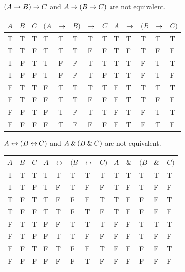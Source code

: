 \begin{earg}
\item $(A \rightarrow B) \rightarrow C$ and $A \rightarrow (B \rightarrow C)$ are not equivalent.
\begin{flushleft}
\begin{tabular}{d d d | f e e e h | f e e e e}
$A$ & $B$ & $C$ & $(A$ & $\rightarrow$ & $B)$ & $\rightarrow$ & $C$ & $A$ & $\rightarrow$ & $(B$ & $\rightarrow$ & $C)$\\
\hline
T & T & T &      T & T & T &   T & T &      T & T &   T & T & T\Tstrut\\
T & T & F &      T & T & T &   F & F &      T & F &   T & F & F\\
T & F & T &      T & F & F &   T & T &      T & T &   F & T & T\\
T & F & F &      T & F & F &   T & F &      T & T &   F & T & F\\\hline
F & T & T &      F & T & T &   T & T &      F & T &   T & T & T\Tstrut\\
F & T & F &      F & T & T &   F & F &      F & T &   T & F & F\\
F & F & T &      F & T & F &   T & T &      F & T &   F & T & T\\
F & F & F &      F & T & F &   F & F &      F & T &   F & T & F 
\end{tabular}
\end{flushleft}\medskip

\begin{minipage}{10cm}
\item $A \leftrightarrow (B \leftrightarrow C)$ and $A \mathbin{\&} (B \mathbin{\&} C)$ are not equivalent.
\begin{flushleft}
\begin{tabular}{d d d | f e e e h | f e e e e}
$A$ & $B$ & $C$ & $A$ & $\leftrightarrow$ & $(B$ & $\leftrightarrow$ & $C)$ & $A$ & $\mathbin{\&}$ & $(B$ & $\mathbin{\&}$ & $C)$\\
\hline
T & T & T &    T & T &    T & T &  T &       T & T &   T & T & T\Tstrut\\
T & T & F &    T & F &    T & F &  F &        T & F &   T & F & F\\
T & F & T &    T & F &    F & F &  T &        T & F &   F & F & T\\
T & F & F &    T & T &    F & T &  F &        T & F &   F & F & F\\\hline
F & T & T &    F & F &    T & T &  T &        F & F &   T & T & T\Tstrut\\
F & T & F &    F & T &    T & F &  F &        F & F &   T & F & F\\
F & F & T &    F & T &    F & F &  T &        F & F &   F & F & T\\
F & F & F &    F & F &    F & T &  F &        F & F &   F & F & F
\end{tabular}
\end{flushleft}\medskip
\end{minipage}

\end{earg}


